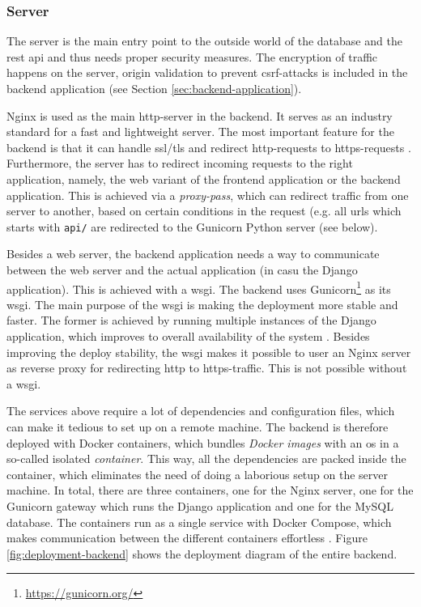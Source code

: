 \subsubsection{Server}
The server is the main entry point to the outside world of the database and the \ac{rest} \ac{api} and thus needs proper security measures. The encryption of traffic happens on the server, origin validation to prevent \ac{csrf}-attacks is included in the backend application (see Section \ref{sec:backend-application}). 

\ind Nginx is used as the main \ac{http}-server in the backend. It serves as an industry standard for a fast and lightweight server. The most important feature for the backend is that it can handle \ac{ssl}/\ac{tls} and redirect \ac{http}-requests to \ac{https}-requests \cite{nginx}. Furthermore, the server has to redirect incoming requests to the right application, namely, the web variant of the frontend application or the backend application. This is achieved via a \textit{proxy-pass}, which can redirect traffic from one server to another, based on certain conditions in the request (e.g. all \acp{url} which starts with \texttt{api/} are redirected to the Gunicorn Python server (see below).

\ind Besides a web server, the backend application needs a way to communicate between the web server and the actual application (in casu the Django application). This is achieved with a \ac{wsgi}. The backend uses Gunicorn\footnote{\url{https://gunicorn.org/}} as its \ac{wsgi}. The main purpose of the \ac{wsgi} is making the deployment more stable and faster. The former is achieved by running multiple instances of the Django application, which improves to overall availability of the system \cite{gunicorn}. Besides improving the deploy stability, the \ac{wsgi} makes it possible to user an Nginx server as reverse proxy for redirecting \ac{http} to \ac{https}-traffic. This is not possible without a \ac{wsgi}.

\ind The services above require a lot of dependencies and configuration files, which can make it tedious to set up on a remote machine. The backend is therefore deployed with Docker containers, which bundles \textit{Docker images} with an \ac{os} in a so-called isolated \textit{container}. This way, all the dependencies are packed inside the container, which eliminates the need of doing a laborious setup on the server machine. In total, there are three containers, one for the Nginx server, one for the Gunicorn gateway which runs the Django application and one for the MySQL database. The containers run as a single service with Docker Compose, which makes communication between the different containers effortless \cite{docker-compose}. Figure \ref{fig:deployment-backend} shows the deployment diagram of the entire backend.

